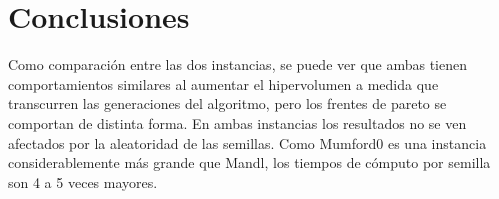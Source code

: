 \section{Conclusiones}

Como comparación entre las dos instancias, se puede ver que ambas tienen comportamientos similares al aumentar el hipervolumen a medida que transcurren las generaciones del algoritmo, pero los frentes de pareto se comportan de distinta forma. En ambas instancias los resultados no se ven afectados por la aleatoridad de las semillas. Como Mumford0 es una instancia considerablemente más grande que Mandl, los tiempos de cómputo por semilla son 4 a 5 veces mayores.